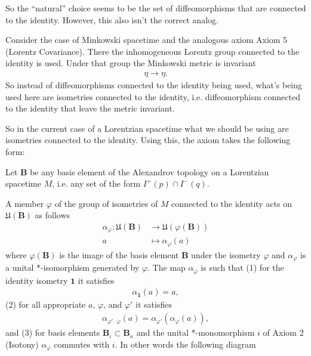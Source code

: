 \begin{definition}
So the ``natural'' choice seems to be the set of diffeomorphisms that are connected to the identity. However, this also isn't the correct analog.

Consider the case of Minkowski spacetime and the analogous axiom Axiom 5 (Lorentz Covariance). There the inhomogeneous Lorentz group connected to the identity is used. Under that group the Minkowski metric is invariant
\begin{align}
    \eta \longrightarrow \eta.
\end{align}
So instead of diffeomorphisms connected to the identity being used, what's being used here are isometries connected to the identity, i.e. diffeomorphism connected to the identity that leave the metric invariant.

So in the current case of a Lorentzian spacetime what we should be using are isometries connected to the identity. Using this, the axiom takes the following form:

\begin{axiom}
    Let $\mathbf{B}$ be any basis element of the Alexandrov topology on a Lorentzian spacetime $M$, i.e. any set of the form $I^+(p) \cap I^-(q)$.
    
    A member $\varphi$ of the group of isometries of $M$ connected to the identity acts on $\mathfrak{U}(\mathbf{B})$ as follows
    \begin{align}
        \alpha_\varphi : \mathfrak{U}(\mathbf{B}) &\longrightarrow \mathfrak{U}(\varphi(\mathbf{B})) \\
                                   a              &\longmapsto     \alpha_\varphi(a)
    \end{align}
    where $\varphi(\mathbf{B})$ is the image of the basis element $\mathbf{B}$ under the isometry $\varphi$ and $\alpha_\varphi$ is a unital *-isomorphism generated by $\varphi$. The map $\alpha_\varphi$ is such that (1) for the identity isometry $\mathbf{1}$ it satisfies
    \begin{align}
        \alpha_{\mathbf{1}}(a) = a,
    \end{align}
    (2) for all appropriate $a$, $\varphi$, and $\varphi'$ it satisfies
    \begin{align}
        \alpha_{\varphi' \cdot \varphi}(a) = \alpha_{\varphi'}(\alpha_{\varphi}(a)),
    \end{align}
    and (3) for basis elements $\mathbf{B}_\iota \subset \mathbf{B}_\kappa$ and the unital *-monomorphism $i$ of Axiom 2 (Isotony) $\alpha_\varphi$ commutes with $i$. In other words the following diagram


\end{axiom}
\end{definition}
